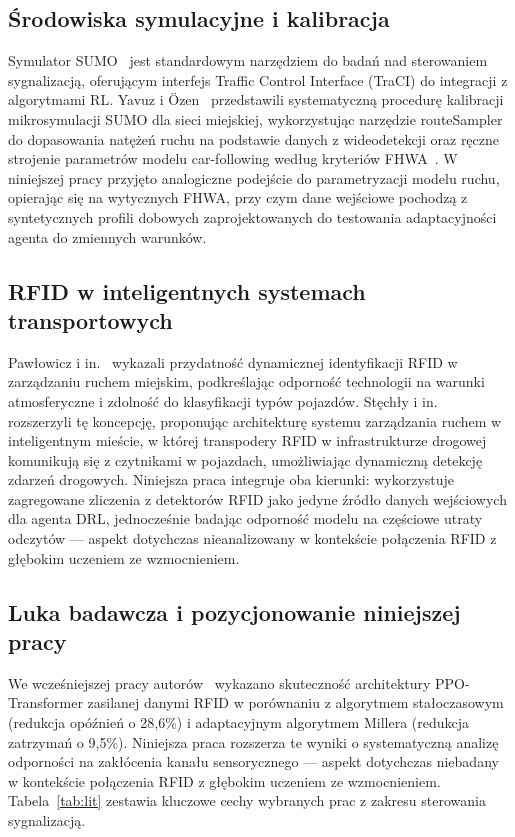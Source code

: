 \documentclass[10pt,a4paper]{article}
\begin{document}
\subsection{Środowiska symulacyjne i kalibracja}

Symulator SUMO~\cite{ref4} jest standardowym narzędziem do badań nad sterowaniem sygnalizacją, oferującym interfejs Traffic Control Interface (TraCI) do integracji z algorytmami RL. Yavuz i Özen~\cite{ref10} przedstawili systematyczną procedurę kalibracji mikrosymulacji SUMO dla sieci miejskiej, wykorzystując narzędzie routeSampler~\cite{ref8} do dopasowania natężeń ruchu na podstawie danych z wideodetekcji oraz ręczne strojenie parametrów modelu car-following według kryteriów FHWA~\cite{ref7}. W niniejszej pracy przyjęto analogiczne podejście do parametryzacji modelu ruchu, opierając się na wytycznych FHWA, przy czym dane wejściowe pochodzą z syntetycznych profili dobowych zaprojektowanych do testowania adaptacyjności agenta do zmiennych warunków.

\subsection{RFID w inteligentnych systemach transportowych}

Pawłowicz i in.~\cite{ref3} wykazali przydatność dynamicznej identyfikacji RFID w zarządzaniu ruchem miejskim, podkreślając odporność technologii na warunki atmosferyczne i zdolność do klasyfikacji typów pojazdów. Stęchły i in.~\cite{ref15} rozszerzyli tę koncepcję, proponując architekturę systemu zarządzania ruchem w inteligentnym mieście, w której transpodery RFID w infrastrukturze drogowej komunikują się z czytnikami w pojazdach, umożliwiając dynamiczną detekcję zdarzeń drogowych. Niniejsza praca integruje oba kierunki: wykorzystuje zagregowane zliczenia z detektorów RFID jako jedyne źródło danych wejściowych dla agenta DRL, jednocześnie badając odporność modelu na częściowe utraty odczytów --- aspekt dotychczas nieanalizowany w kontekście połączenia RFID z głębokim uczeniem ze wzmocnieniem.

\subsection{Luka badawcza i pozycjonowanie niniejszej pracy}

We wcześniejszej pracy autorów~\cite{ref16} wykazano skuteczność architektury PPO-Transformer zasilanej danymi RFID w porównaniu z algorytmem stałoczasowym (redukcja opóźnień o 28,6\%) i adaptacyjnym algorytmem Millera (redukcja zatrzymań o 9,5\%). Niniejsza praca rozszerza te wyniki o systematyczną analizę odporności na zakłócenia kanału sensorycznego --- aspekt dotychczas niebadany w kontekście połączenia RFID z głębokim uczeniem ze wzmocnieniem. Tabela~\ref{tab:lit} zestawia kluczowe cechy wybranych prac z zakresu sterowania sygnalizacją.
\end{document}
